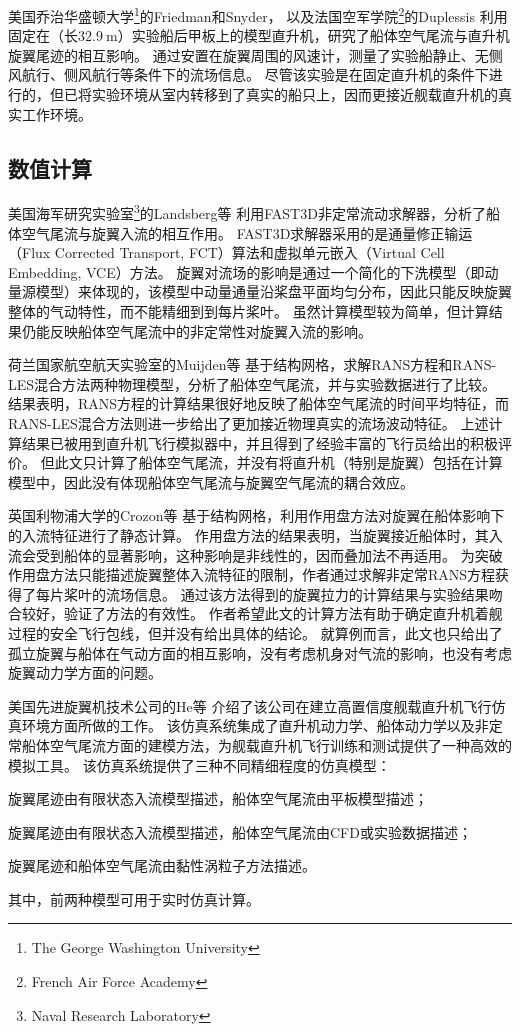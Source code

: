 \documentclass[doctor,openright,twoside,color]{buaathesis}
\begin{document}
美国乔治华盛顿大学\footnote{The George Washington University}的Friedman和Snyder，
以及法国空军学院\footnote{French Air Force Academy}的Duplessis
利用固定在（长$32.9~\mathrm{m}$）实验船后甲板上的模型直升机，研究了船体空气尾流与直升机旋翼尾迹的相互影响。
通过安置在旋翼周围的风速计，测量了实验船静止、无侧风航行、侧风航行等条件下的流场信息。
尽管该实验是在固定直升机的条件下进行的，但已将实验环境从室内转移到了真实的船只上，因而更接近舰载直升机的真实工作环境。

\subsection{数值计算}
美国海军研究实验室\footnote{Naval Research Laboratory}的Landsberg等
利用FAST3D非定常流动求解器，分析了船体空气尾流与旋翼入流的相互作用。
FAST3D求解器采用的是通量修正输运（Flux Corrected Transport, FCT）算法和虚拟单元嵌入（Virtual Cell Embedding, VCE）方法。
旋翼对流场的影响是通过一个简化的下洗模型（即动量源模型）来体现的，该模型中动量通量沿桨盘平面均匀分布，因此只能反映旋翼整体的气动特性，而不能精细到到每片桨叶。
虽然计算模型较为简单，但计算结果仍能反映船体空气尾流中的非定常性对旋翼入流的影响。

荷兰国家航空航天实验室的Muijden等
基于结构网格，求解RANS方程和RANS-LES混合方法两种物理模型，分析了船体空气尾流，并与实验数据进行了比较。
结果表明，RANS方程的计算结果很好地反映了船体空气尾流的时间平均特征，而RANS-LES混合方法则进一步给出了更加接近物理真实的流场波动特征。
上述计算结果已被用到直升机飞行模拟器中，并且得到了经验丰富的飞行员给出的积极评价。
但此文只计算了船体空气尾流，并没有将直升机（特别是旋翼）包括在计算模型中，因此没有体现船体空气尾流与旋翼空气尾流的耦合效应。

英国利物浦大学的Crozon等
基于结构网格，利用作用盘方法对旋翼在船体影响下的入流特征进行了静态计算。
作用盘方法的结果表明，当旋翼接近船体时，其入流会受到船体的显著影响，这种影响是非线性的，因而叠加法不再适用。
为突破作用盘方法只能描述旋翼整体入流特征的限制，作者通过求解非定常RANS方程获得了每片桨叶的流场信息。
通过该方法得到的旋翼拉力的计算结果与实验结果吻合较好，验证了方法的有效性。
作者希望此文的计算方法有助于确定直升机着舰过程的安全飞行包线，但并没有给出具体的结论。
就算例而言，此文也只给出了孤立旋翼与船体在气动方面的相互影响，没有考虑机身对气流的影响，也没有考虑旋翼动力学方面的问题。

美国先进旋翼机技术公司的He等
介绍了该公司在建立高置信度舰载直升机飞行仿真环境方面所做的工作。
该仿真系统集成了直升机动力学、船体动力学以及非定常船体空气尾流方面的建模方法，为舰载直升机飞行训练和测试提供了一种高效的模拟工具。
该仿真系统提供了三种不同精细程度的仿真模型：
\begin{compactitem}
  \item 旋翼尾迹由有限状态入流模型描述，船体空气尾流由平板模型描述；
  \item 旋翼尾迹由有限状态入流模型描述，船体空气尾流由CFD或实验数据描述；
  \item 旋翼尾迹和船体空气尾流由黏性涡粒子方法描述。
\end{compactitem}
其中，前两种模型可用于实时仿真计算。
\end{document}
